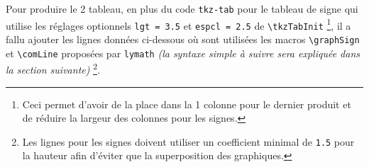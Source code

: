\documentclass[12pt,a4paper]{article}
\newcommand\env[1]{\texttt{#1}}
\newcommand\macro[1]{\env{\textbackslash{}#1}}
\theoremstyle{definition}
\begin{document}
\begin{center}
\end{center}


Pour produire le 2\ieme{} tableau, en plus du code \verb#tkz-tab# pour le tableau de signe qui utilise les réglages optionnels \verb#lgt = 3.5# et 
\verb#espcl = 2.5# de \macro{tkzTabInit}
\footnote{
	Ceci permet d'avoir de la place dans la 1\iere{} colonne pour le dernier produit et de réduire la largeur des colonnes pour les signes.
},
il a fallu ajouter les lignes données ci-dessous où sont utilisées les macros \macro{graphSign} et \macro{comLine} proposées par \verb+lymath+ \emph{(la syntaxe simple à suivre sera expliquée dans la section suivante)}
\footnote{
	Les lignes pour les signes doivent utiliser un coefficient minimal de \texttt{1.5} pour la hauteur afin d'éviter que la superposition des graphiques.
}.

\medskip

\begin{latexex-alone}
\end{latexex-alone}
\end{document}
